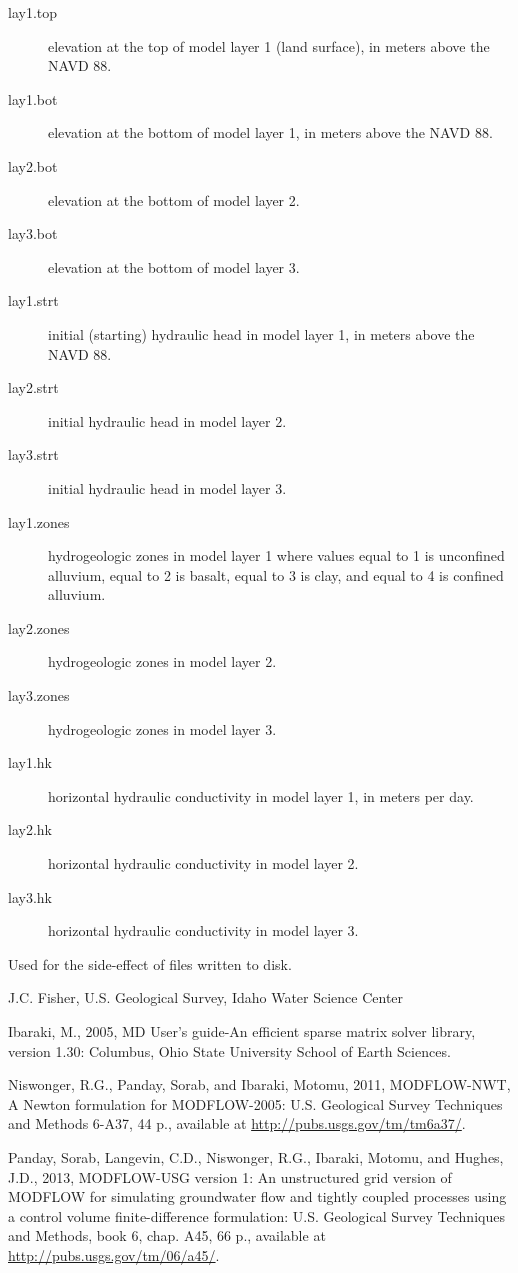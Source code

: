 \documentclass[a4paper]{book}
\begin{document}
\begin{Details}
\begin{description}
\item[lay1.top] elevation at the top of model layer 1 (land surface),
in meters above the NAVD 88.
\item[lay1.bot] elevation at the bottom of model layer 1, in meters above the NAVD 88.
\item[lay2.bot] elevation at the bottom of model layer 2.
\item[lay3.bot] elevation at the bottom of model layer 3.
\item[lay1.strt] initial (starting) hydraulic head in model layer 1,
in meters above the NAVD 88.
\item[lay2.strt] initial hydraulic head in model layer 2.
\item[lay3.strt] initial hydraulic head in model layer 3.
\item[lay1.zones] hydrogeologic zones in model layer 1 where values
equal to 1 is unconfined alluvium, equal to 2 is basalt,
equal to 3 is clay, and equal to 4 is confined alluvium.
\item[lay2.zones] hydrogeologic zones in model layer 2.
\item[lay3.zones] hydrogeologic zones in model layer 3.
\item[lay1.hk] horizontal hydraulic conductivity in model layer 1, in meters per day.
\item[lay2.hk] horizontal hydraulic conductivity in model layer 2.
\item[lay3.hk] horizontal hydraulic conductivity in model layer 3.

\end{description}

\end{Details}
%
\begin{Value}
Used for the side-effect of files written to disk.
\end{Value}
%
\begin{Author}\relax
J.C. Fisher, U.S. Geological Survey, Idaho Water Science Center
\end{Author}
%
\begin{References}\relax
Ibaraki, M., 2005, \eqn{\chi}{}MD User's guide-An efficient sparse matrix solver library, version 1.30:
Columbus, Ohio State University School of Earth Sciences.

Niswonger, R.G., Panday, Sorab, and Ibaraki, Motomu, 2011, MODFLOW-NWT, A Newton formulation for MODFLOW-2005:
U.S. Geological Survey Techniques and Methods 6-A37, 44 p., available at \url{http://pubs.usgs.gov/tm/tm6a37/}.

Panday, Sorab, Langevin, C.D., Niswonger, R.G., Ibaraki, Motomu, and Hughes, J.D., 2013, MODFLOW-USG version 1:
An unstructured grid version of MODFLOW for simulating groundwater flow and tightly coupled processes using a
control volume finite-difference formulation: U.S. Geological Survey Techniques and Methods, book 6, chap. A45,
66 p., available at \url{http://pubs.usgs.gov/tm/06/a45/}.
\end{References}
\end{document}
